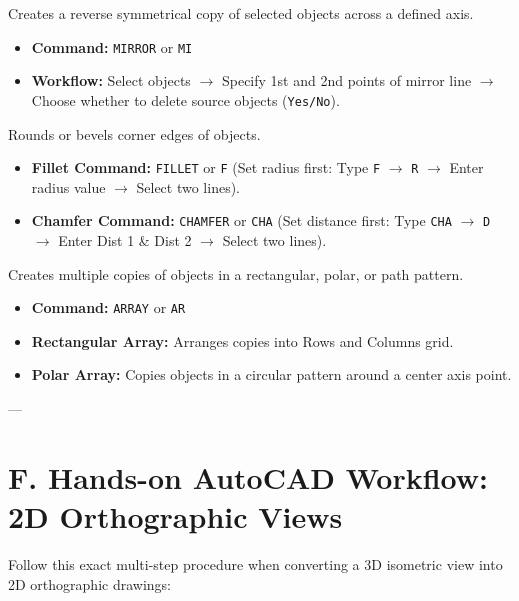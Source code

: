 \begin{autocadcmd}[MIRROR]
Creates a reverse symmetrical copy of selected objects across a defined axis.
\begin{itemize}
    \item \textbf{Command:} \texttt{MIRROR} or \texttt{MI}
    \item \textbf{Workflow:} Select objects $\to$ Specify 1st and 2nd points of mirror line $\to$ Choose whether to delete source objects (\texttt{Yes/No}).
\end{itemize}
\end{autocadcmd}

\begin{autocadcmd}
Rounds or bevels corner edges of objects.
\begin{itemize}
    \item \textbf{Fillet Command:} \texttt{FILLET} or \texttt{F} (Set radius first: Type \texttt{F} $\to$ \texttt{R} $\to$ Enter radius value $\to$ Select two lines).
    \item \textbf{Chamfer Command:} \texttt{CHAMFER} or \texttt{CHA} (Set distance first: Type \texttt{CHA} $\to$ \texttt{D} $\to$ Enter Dist 1 \& Dist 2 $\to$ Select two lines).
\end{itemize}
\end{autocadcmd}

\begin{autocadcmd}[ARRAY]
Creates multiple copies of objects in a rectangular, polar, or path pattern.
\begin{itemize}
    \item \textbf{Command:} \texttt{ARRAY} or \texttt{AR}
    \item \textbf{Rectangular Array:} Arranges copies into Rows and Columns grid.
    \item \textbf{Polar Array:} Copies objects in a circular pattern around a center axis point.
\end{itemize}
\end{autocadcmd}

---

\section{F. Hands-on AutoCAD Workflow: 2D Orthographic Views}

Follow this exact multi-step procedure when converting a 3D isometric view into 2D orthographic drawings:

